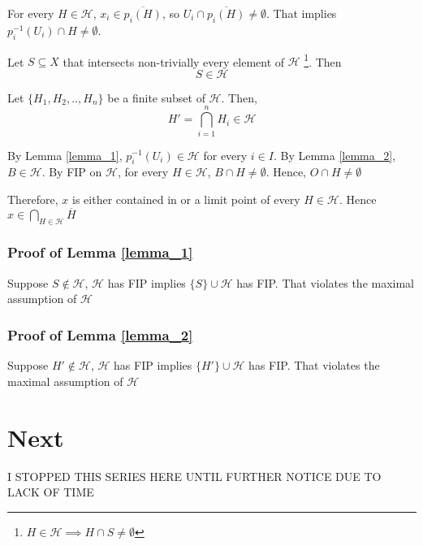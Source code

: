 \documentclass{article}
\begin{document}
For every $H \in \mathcal{H}$, $x_i \in \overline{p_i(H)}$, so $U_i \cap \overline{p_i(H)} \neq \emptyset$. That implies $p_i^{-1}(U_i) \cap H \neq \emptyset$.

\begin{lemma}
    \label{lemma_1}
    Let $S \subseteq X$ that intersects non-trivially every element of $\mathcal{H}$ \footnote{$H \in \mathcal{H} \implies H \cap S \neq \emptyset$}. Then
    $$
        S \in \mathcal{H}
    $$
\end{lemma}

\begin{lemma}
    \label{lemma_2}
    Let $\{H_1, H_2, .., H_n \}$ be a finite subset of $\mathcal{H}$. Then,
    $$
        H' = \bigcap_{i = 1}^n H_i \in \mathcal{H}
    $$
\end{lemma}

By Lemma \ref{lemma_1}, $p_i^{-1}(U_i) \in \mathcal{H}$ for every $i \in I$. By Lemma \ref{lemma_2}, $B \in \mathcal{H}$. By FIP on $\mathcal{H}$, for every $H \in \mathcal{H}$, $B \cap H \neq \emptyset$. Hence, $O \cap H \neq \emptyset$

Therefore, $x$ is either contained in or a limit point of every $H \in \mathcal{H}$. Hence $x \in \bigcap_{H \in \mathcal{H}} \overline{H}$

\subsubsection*{Proof of Lemma \ref{lemma_1}}
Suppose $S \notin \mathcal{H}$, $\mathcal{H}$ has FIP implies $\{ S\} \cup \mathcal{H}$ has FIP. That violates the maximal assumption of $\mathcal{H}$

\subsubsection*{Proof of Lemma \ref{lemma_2}}
Suppose $H' \notin \mathcal{H}$, $\mathcal{H}$ has FIP implies $\{ H'\} \cup \mathcal{H}$ has FIP. That violates the maximal assumption of $\mathcal{H}$


\section*{Next}

I STOPPED THIS SERIES HERE UNTIL FURTHER NOTICE DUE TO LACK OF TIME
\end{document}
